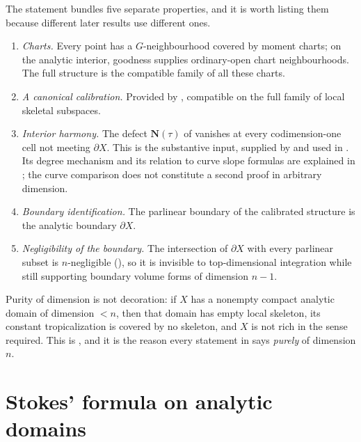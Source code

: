 \begin{remark}
\label{rem:ch13-tropical-structure-contents}
The statement bundles five separate properties, and it is worth listing them
because different later results use different ones.
\begin{enumerate}
\item\label{itm:ch13-ts:charts} \emph{Charts.} Every point has a
  $G$-neighbourhood covered by moment charts; on the analytic interior,
  goodness supplies ordinary-open chart neighbourhoods.  The full structure
  is the compatible family of all these charts.
\item\label{itm:ch13-ts:calib} \emph{A canonical calibration.} Provided by
  , compatible on the full family of
  local skeletal subspaces.
\item\label{itm:ch13-ts:harm} \emph{Interior harmony.} The defect
  $\mathbf N(\tau)$ of  vanishes at every
  codimension-one cell not meeting $\partial X$.  This is the substantive
  input, supplied by \cite[Theorem~15.6.1]{CLD25} and used in
  .  Its degree mechanism and its
  relation to curve slope formulas are explained in
  ; the curve comparison does not
  constitute a second proof in arbitrary dimension.
\item\label{itm:ch13-ts:bdry} \emph{Boundary identification.} The parlinear
  boundary of the calibrated structure is the analytic boundary $\partial X$.
\item\label{itm:ch13-ts:thin} \emph{Negligibility of the boundary.} The
  intersection of $\partial X$ with every parlinear subset is
  $n$-negligible (), so it is invisible to
  top-dimensional integration while still supporting boundary volume forms
  of dimension $n-1$.
\end{enumerate}
Purity of dimension is not decoration: if $X$ has a nonempty compact analytic
domain of dimension $<n$, then that domain has empty local skeleton, its
constant tropicalization is covered by no skeleton, and $X$ is not rich in
the sense required.  This is \cite[Remark~15.7.3]{CLD25}, and it is the
reason every statement in  says
\emph{purely} of dimension $n$.
\end{remark}

\section{Stokes' formula on analytic domains}
\label{sec:ch13-stokes}

